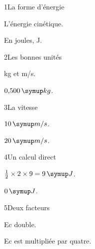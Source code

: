 \par\noindent\begin{minipage}{\linewidth}
\begin{corrige}{1}{La forme d’énergie}
\begin{questions}
\item L’énergie cinétique.
\item En joules, J.
\end{questions}
\end{corrige}
\end{minipage}
\par\noindent\begin{minipage}{\linewidth}
\begin{corrige}{2}{Les bonnes unités}
\begin{questions}
\item kg et m/s.
\item $0{,}500\unite{kg}$.
\end{questions}
\end{corrige}
\end{minipage}
\par\noindent\begin{minipage}{\linewidth}
\begin{corrige}{3}{La vitesse}
\begin{questions}
\item $10\unite{m/s}$.
\item $20\unite{m/s}$.
\end{questions}
\end{corrige}
\end{minipage}
\par\noindent\begin{minipage}{\linewidth}
\begin{corrige}{4}{Un calcul direct}
\begin{questions}
\item $\tfrac12\times2\times9=9\unite J$.
\item $0\unite J$.
\end{questions}
\end{corrige}
\end{minipage}
\par\noindent\begin{minipage}{\linewidth}
\begin{corrige}{5}{Deux facteurs}
\begin{questions}
\item Ec double.
\item Ec est multipliée par quatre.
\end{questions}
\end{corrige}
\end{minipage}
